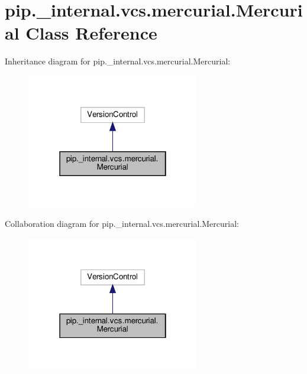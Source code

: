 \hypertarget{classpip_1_1__internal_1_1vcs_1_1mercurial_1_1Mercurial}{}\section{pip.\+\_\+internal.\+vcs.\+mercurial.\+Mercurial Class Reference}
\label{classpip_1_1__internal_1_1vcs_1_1mercurial_1_1Mercurial}


Inheritance diagram for pip.\+\_\+internal.\+vcs.\+mercurial.\+Mercurial\+:
\nopagebreak
\begin{figure}[H]
\begin{center}
\leavevmode
\includegraphics[width=214pt]{classpip_1_1__internal_1_1vcs_1_1mercurial_1_1Mercurial__inherit__graph}
\end{center}
\end{figure}


Collaboration diagram for pip.\+\_\+internal.\+vcs.\+mercurial.\+Mercurial\+:
\nopagebreak
\begin{figure}[H]
\begin{center}
\leavevmode
\includegraphics[width=214pt]{classpip_1_1__internal_1_1vcs_1_1mercurial_1_1Mercurial__coll__graph}
\end{center}
\end{figure}
